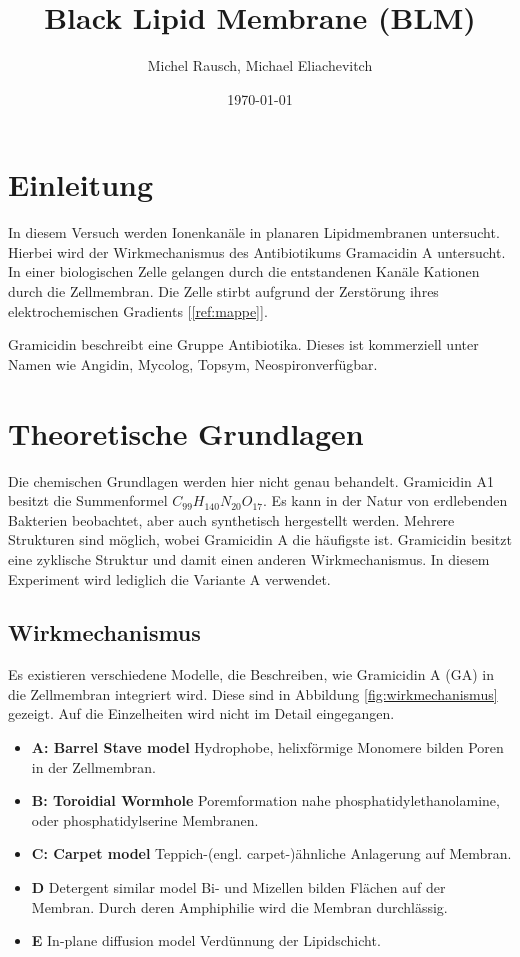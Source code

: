 \documentclass[a4paper,ngerman]{scrartcl}
\title{Black Lipid Membrane (BLM)}
\date{\today}
\author{Michel Rausch, Michael Eliachevitch}
\begin{document}
\maketitle
\tableofcontents
\newpage

\section{Einleitung}

In diesem Versuch werden Ionenkanäle in planaren Lipidmembranen untersucht. Hierbei wird der Wirkmechanismus des Antibiotikums Gramacidin A untersucht. In einer biologischen Zelle gelangen durch die entstandenen Kanäle Kationen durch die Zellmembran. Die Zelle stirbt aufgrund der Zerstörung ihres elektrochemischen Gradients [\ref{ref:mappe}].

Gramicidin beschreibt eine Gruppe Antibiotika. Dieses ist kommerziell unter Namen wie Angidin\textregistered , Mycolog\textregistered , Topsym\textregistered , Neospiron\textregistered  verfügbar. 


\section{Theoretische Grundlagen}

Die chemischen Grundlagen werden hier nicht genau behandelt. Gramicidin A1 besitzt die Summenformel $C_{99}H_{140}N_{20}O_{17}$. Es kann in der Natur von erdlebenden Bakterien beobachtet, aber auch synthetisch hergestellt werden. Mehrere Strukturen sind möglich, wobei Gramicidin A die häufigste ist. Gramicidin besitzt eine zyklische Struktur und damit einen anderen Wirkmechanismus. In diesem Experiment wird lediglich die Variante A verwendet.

\subsection{Wirkmechanismus}

Es existieren verschiedene Modelle, die Beschreiben, wie Gramicidin A (GA) in die Zellmembran integriert wird. Diese sind in Abbildung \ref{fig:wirkmechanismus} gezeigt. Auf die Einzelheiten wird nicht im Detail eingegangen.
\begin{itemize}
\item \textbf{A: Barrel Stave model} 
Hydrophobe, helixförmige Monomere bilden Poren in der Zellmembran.
\item \textbf{B: Toroidial Wormhole}  
Poremformation nahe phosphatidylethanolamine, oder phosphatidylserine Membranen. 
\item \textbf{C: Carpet model}  
Teppich-(engl. carpet-)ähnliche Anlagerung auf Membran.
\item \textbf{D} Detergent similar model
Bi- und Mizellen bilden Flächen auf der Membran. Durch deren Amphiphilie wird die Membran durchlässig.
\item \textbf{E} In-plane diffusion model
Verdünnung der Lipidschicht.
\end{itemize}
\end{document}
